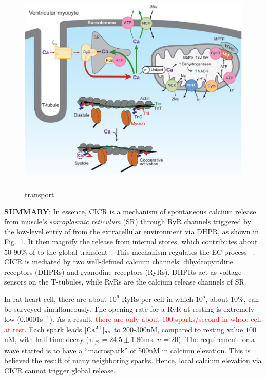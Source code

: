 \begin{figure}[htb]
  \centerline{\includegraphics[height=10cm]{./images/Ca_transport.eps}}
  \caption{ transport}\label{fig:Ca_transport}
\end{figure}

\begin{framed}
  
  {\bf SUMMARY}: In essence, CICR is a mechanism of spontaneous
  calcium release from muscle's {\it sarcoplasmic reticulum} (SR)
  through RyR channels triggered by the low-level entry of 
  from the extracellular environment via DHPR, as shown in
  Fig.~\ref{fig:Ca_transport}. It then magnify the  release
  from internal stores, which contributes about 50-90\% of 
  to the global  transient~\citep{bers2001ecc}. This
  mechanism regulates the EC process ~\citep{bers2008cca}.  CICR is
  mediated by two well-defined calcium channels: dihydropyridine
  receptors (DHPRs) and ryanodine receptors (RyRs). DHPRs act as
  voltage sensors on the T-tubules, while RyRs are the calcium
  release channels of SR.
\end{framed}


In rat heart cell, there are about $10^6$ RyRs per cell in which
$10^5$, about $10\%$, can be surveyed simultaneously. The opening rate
for a RyR at resting is extremely low ($0.0001$s$^{-1}$).  As a
result,
\textcolor{red}{there are only about 100 sparks/second in whole cell
  at rest}.
Each  spark leads $[\ce{Ca^2+}]_{ds}$ to 200-300nM,
compared to resting value $100$nM, with half-time decay
($\tau_{1/2}=24.5 \pm 1.86$ms, $n=20$). The requirement for a wave
started is to have a ``macrospark'' of 500nM in calcium
elevation. This is believed the result of many neighboring 
sparks.  Hence, local calcium elevation via CICR cannot trigger global
 release.

